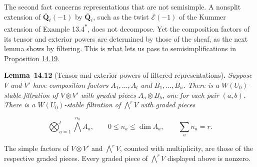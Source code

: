 \documentclass[11pt]{article}
\newenvironment{bpstatement}[2]{\par\addvspace{0.6\baselineskip}\noindent\textbf{#1}#2\textbf{.}\enspace\ignorespaces}
  {\par\addvspace{0.4\baselineskip}}
\newenvironment{bpstatementit}[2]{\begin{bpstatement}{#1}{#2}\itshape\ignorespaces}{\end{bpstatement}}
\newcommand{\bpout}[1]{#1\textsuperscript{\hyperlink{bp-outside}{\ensuremath{\ast}}}}
\begin{document}
\label{bp39}%
The second fact concerns representations that are not semisimple. A nonsplit extension of \(\overline{\mathbf Q}_\ell(-1)\) by \(\overline{\mathbf Q}_\ell\), such as the twist \(\mathcal E(-1)\) of the Kummer extension of Example \bpout{13.4}, does not decompose. Yet the composition factors of its tensor and exterior powers are determined by those of the sheaf, as the next lemma shows by filtering. This is what lets us pass to semisimplifications in Proposition \hyperref[bp61]{14.19}.

\label{bp40}%
\begin{bpstatementit}{Lemma~14.12}{ (Tensor and exterior powers of filtered representations)}
Suppose \(V\) and \(V'\) have composition factors \(A_1,\ldots,A_t\) and \(B_1,\ldots,B_u\). There is a \(W(U_0)\)-stable filtration of \(V\otimes V'\) with graded pieces \(A_a\otimes B_b\), one for each pair \((a,b)\). There is a \(W(U_0)\)-stable filtration of \(\bigwedge^rV\) with graded pieces

\[
\bigotimes_{a=1}^t\bigwedge^{n_a}A_a,
\qquad 0\le n_a\le\dim A_a,\qquad\sum_an_a=r.
\]

The simple factors of \(V\otimes V'\) and \(\bigwedge^rV\), counted with multiplicity, are those of the respective graded pieces. Every graded piece of \(\bigwedge^rV\) displayed above is nonzero.
\end{bpstatementit}
\end{document}
